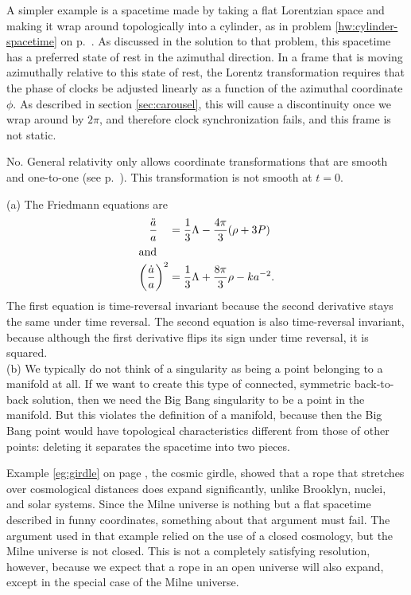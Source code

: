 A simpler example is a spacetime made by taking a flat Lorentzian space and making it wrap around topologically
into a cylinder, as in problem \ref{hw:cylinder-spacetime} on p.~\pageref{hw:cylinder-spacetime}. As discussed
in the solution to that problem, this spacetime has a preferred state of rest in the azimuthal direction.
In a frame that is moving azimuthally relative to this state of rest, the Lorentz transformation requires that
the phase of clocks be adjusted linearly as a function of the azimuthal coordinate $\phi$. As described
in section \ref{sec:carousel}, this will cause a discontinuity once we wrap around by $2\pi$, and therefore
clock synchronization fails, and this frame is not static.


No. General relativity only allows coordinate transformations that are smooth and one-to-one (see p.~\pageref{diffeomorphism}).
This transformation is not smooth at $t=0$.

(a) The Friedmann equations are
\begin{align*}
  \frac{\ddot{a}}{a}   \quad          &= \frac{1}{3}\Lambda - \frac{4\pi}{3}(\rho+3P) \\
\intertext{and}
  \left(\frac{\dot{a}}{a}\right)^2    &= \frac{1}{3}\Lambda + \frac{8\pi}{3}\rho-k a^{-2}.
\end{align*}
The first equation is time-reversal invariant because the second derivative stays the same under time reversal.
The second equation is also time-reversal invariant, because although the first derivative flips its sign
under time reversal, it is squared.\\
(b) We typically do not think of a singularity as being a point belonging to a manifold at all. If we want to
create this type of connected, symmetric back-to-back solution, then we need the Big Bang singularity to be
a point in the manifold. But this violates the definition of a manifold, because then the Big Bang point would
have topological characteristics different from those of other points: deleting it separates the spacetime into
two pieces.

Example \ref{eg:girdle} on page \pageref{eg:girdle}, the cosmic girdle, showed that a rope
that stretches over cosmological distances does expand significantly, unlike Brooklyn, nuclei, and solar systems.
Since the Milne universe is nothing but a flat spacetime described in funny coordinates, something about
that argument must fail. The argument used in that example relied on the use of a closed cosmology,
but the Milne universe is not closed. This is not a completely satisfying resolution, however, because
we expect that a rope in an open universe will also expand, except in the special case of the Milne universe.

